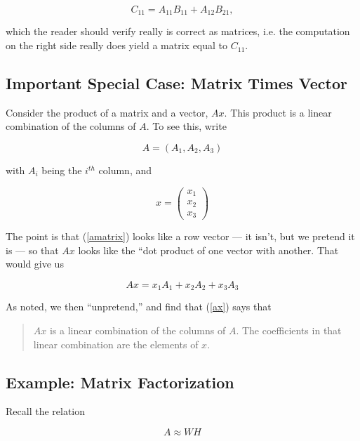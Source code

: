 \begin{equation}
C_{11} = A_{11} B_{11} + A_{12} B_{21}, 
\end{equation}

which the reader should verify really is correct as matrices, i.e. the
computation on the right side really does yield a matrix equal to $C_{11}$.

\subsection{Important Special Case:  Matrix Times Vector}

Consider the product of a matrix and a vector, $Ax$.  This product is a
linear combination of the columns of $A$.  To see this, write

\begin{equation}
\label{amatrix}
A = (A_1, A_2, A_3)
\end{equation}

with $A_i$ being the $i^{th}$ column, and

\begin{equation}
x = 
\left ( 
\begin{array}{c}
x_1 \\
x_2 \\
x_3
\end{array}
\right )
\end{equation}

The point is that (\ref{amatrix}) looks like a row vector --- it isn't,
but we pretend it is --- so that $Ax$ looks like the ``dot product of
one vector with another.  That would give us

\begin{equation}
\label{ax}
Ax = x_1 A_1 + x_2 A_2 + x_3 A_3
\end{equation}

As noted, we then ``unpretend,'' and find that (\ref{ax}) says that

\begin{quote}
$Ax$ is a linear combination of the columns of $A$.  The coefficients in
that linear combination are the elements of $x$.
\end{quote}

\subsection{Example:  Matrix Factorization}
\label{mfact}

Recall the relation 

\begin{equation}
A \approx WH
\end{equation}

